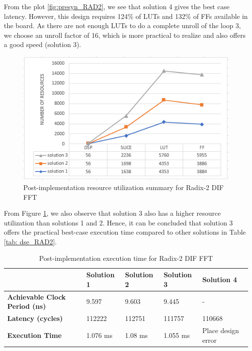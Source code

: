 From the plot \ref{fig:presyn_RAD2}, we see that solution 4 gives the best case latency. However, this design requires 124\% of LUTs and 132\% of FFs available in the board. As there are not enough LUTs to do a complete unroll of the loop 3, we choose an unroll factor of 16, which is more practical to realize and also offers a good speed (solution 3). 
\begin{figure}[h!]
 \centering
 \includegraphics[width=0.75\linewidth]{figures/Butterfly_ResourceUtil.PNG}
 \caption{Post-implementation resource utilization summary for Radix-2 DIF FFT}
 \label{fig:area_butterfly}
\end{figure}
From Figure \ref{fig:area_butterfly}, we also observe that solution 3 also has a higher resource utilization than solutions 1 and 2. Hence, it can be concluded that solution 3 offers the practical best-case execution time compared to other solutions in Table \ref{tab: dse_RAD2}.

\begin{table}[htbp]
\centering
\caption{Post-implementation execution time for Radix-2 DIF FFT}
\label{tab:dse_bfft}
\begin{tabular}{|m{2.5cm}|L|L|L|L|}
\hline
& \textbf{Solution 1} & \textbf{Solution 2} & \textbf{Solution 3} & \textbf{Solution 4} \\ \hline
{\textbf{Achievable Clock Period (ns)}} & 9.597 & 9.603 & 9.445 & - \\ \hline
\textbf{Latency (cycles)}&112222& 112751&111757&110668\\ 
\hline
\textbf{Execution Time}&1.076 ms& 1.08 ms&1.055 ms&Place design error\\ 
\hline
\end{tabular}
\end{table}

